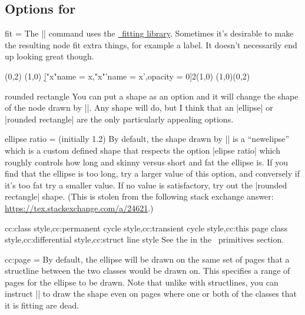 \begin{sseqdata}[|| name = ex1, cohomological Serre grading]
\subsection{Options for \sectionstring\circleclass}
\begin{key}{fit = }
The |\circleclasses| command uses the \href{\pgfmanualurl#section.52}{\tikzpkg\  fitting library}. Sometimes it's desirable to make the resulting node fit extra things, for example a label. It doesn't necessarily end up looking great though.
\begin{codeexample}[]
\begin{sseqpage}[Adams grading,axes gap = 0.7cm]
\class(0,2)
\class(1,0)
\d["x"{name = x},"x"'{name = x',opacity = 0}]2(1,0)
\circleclasses[fit = (x)(x'),rounded rectangle](1,0)(0,2)
\end{sseqpage}
\end{codeexample}
\end{key}

\begin{key}{rounded rectangle}
You can put a shape as an option and it will change the shape of the node drawn by |\circleclasses|. Any shape will do, but I think that an |ellipse| or |rounded rectangle| are the only particularly appealing options.
\end{key}

\begin{key}{ellipse ratio =  (initially 1.2)}
By default, the shape drawn by |\circleclasses| is a ``newelipse'' which is a custom defined shape that respects the option |elipse ratio| which roughly controls how long and skinny versus short and fat the ellipse is. If you find that the ellipse is too long, try a larger value of this option, and conversely if it's too fat try a smaller value. If no value is satisfactory, try out the |rounded rectangle| shape. (This is stolen from the following stack exchange answer: \url{https://tex.stackexchange.com/a/24621}.)
\end{key}

\begin{keylist}{cc:class style,cc:permanent cycle style,cc:transient cycle style,cc:this page class style,cc:differential style,cc:struct line style}
See the  in the \tikzpkg\  primitives section.
\end{keylist}

\begin{key}{cc:page = }
By default, the ellipse will be drawn on the same set of pages that a structline between the two classes would be drawn on. This specifies a range of pages for the ellipse to be drawn. Note that unlike with structlines, you can instruct |\circleclasses| to draw the shape even on pages where one or both of the classes that it is fitting are dead.
\end{key}


\end{sseqdata}
